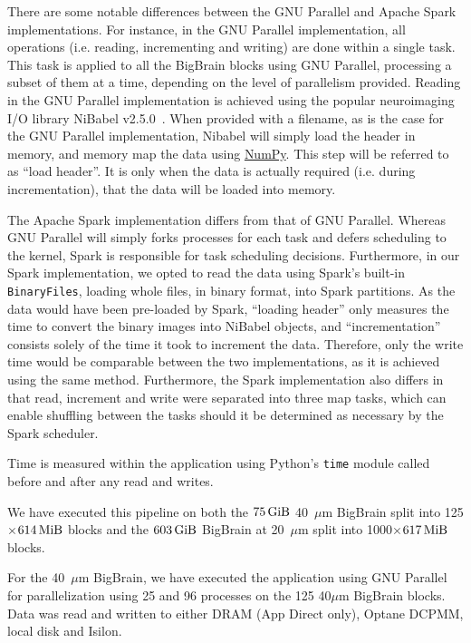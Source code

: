\documentclass[conference]{IEEEtran}
\newcommand{\bigbrain}{BigBrain\xspace}
\begin{document}
There are some notable differences between the GNU Parallel and Apache Spark implementations.
For instance, in the GNU Parallel implementation, all operations (i.e. reading, incrementing and writing)
are done within a single task. This task is applied to all the \bigbrain blocks using GNU Parallel,
processing a subset of them at a time,
depending on the level of parallelism provided. Reading in the GNU Parallel implementation 
is achieved using the popular neuroimaging I/O library NiBabel v2.5.0~\cite{nibabel}. When provided with a filename, as is the case
for the GNU Parallel implementation, Nibabel will simply load the header in memory, and memory map the data
using \href{https://numpy.org/}{NumPy}. This step will be referred to as ``load header''. It is only when the data is actually required
(i.e. during incrementation), that the data will be loaded into memory.

The Apache Spark implementation differs from that of GNU Parallel. Whereas GNU Parallel will
simply forks processes for each task and defers scheduling to the kernel, Spark is responsible for 
task scheduling decisions. Furthermore, in our Spark implementation, we opted to read the data using Spark's built-in
\texttt{BinaryFiles}, loading whole files, in binary format, into Spark partitions. As the
data would have been pre-loaded by Spark, ``loading header'' only measures the time to
convert the binary images into NiBabel objects, and ``incrementation'' consists solely
of the time it took to increment the data. Therefore, only the write time would be
comparable between the two implementations, as it is achieved using the same method.
Furthermore, the Spark implementation also differs in that read, increment and write
were separated into three map tasks, which can enable shuffling between the tasks should 
it be determined as necessary by the Spark scheduler.

Time is measured within the application using Python's \texttt{time} module 
called before and after any read and writes.

We have executed this pipeline on both the $\SI{75}{\gibi\byte}$ 40~$\mu$m 
\bigbrain split into 125$\times$$\SI{614}{\mebi\byte}$ blocks and the $\SI{603}{\gibi\byte}$
\bigbrain at 20~$\mu$m split into 1000$\times$$\SI{617}{\mebi\byte}$ blocks.

For the 40~$\mu$m \bigbrain, we have executed the application using GNU Parallel for parallelization
using 25 and 96 processes on the 125 40$\mu$m \bigbrain blocks. Data was read and written to either
DRAM (App Direct only), Optane DCPMM, local disk and Isilon. 
\end{document}
